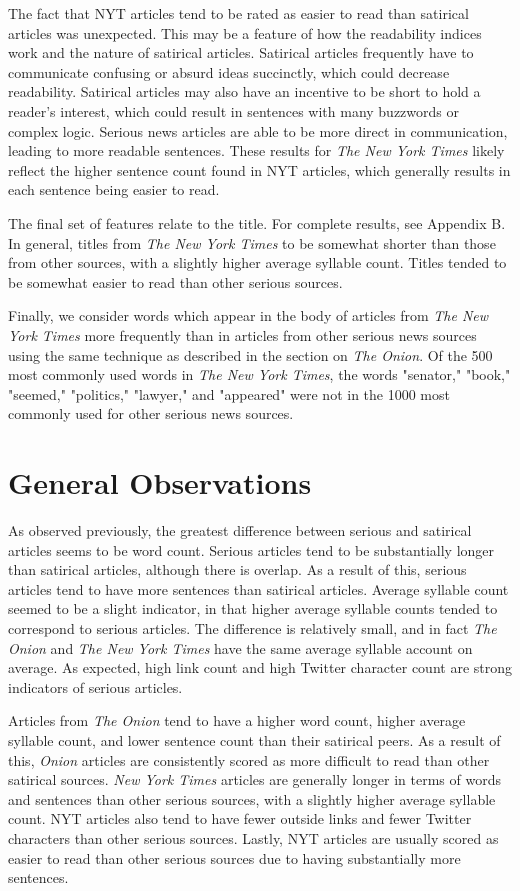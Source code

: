 \documentclass [12 pt] {report}
\begin{document}
The fact that NYT articles tend to be rated as easier to read than satirical articles was unexpected. This may be a feature of how the readability indices work and the nature of satirical articles. Satirical articles frequently have to communicate confusing or absurd ideas succinctly, which could decrease readability. Satirical articles may also have an incentive to be short to hold a reader's interest, which could result in sentences with many buzzwords or complex logic. Serious news articles are able to be more direct in communication, leading to more readable sentences. These results for \textit{The New York Times} likely reflect the higher sentence count found in NYT articles, which generally results in each sentence being easier to read.

The final set of features relate to the title. For complete results, see Appendix B. In general, titles from \textit{The New York Times} to be somewhat shorter than those from other sources, with a slightly higher average syllable count. Titles tended to be somewhat easier to read than other serious sources.

Finally, we consider words which appear in the body of articles from \textit{The New York Times} more frequently than in articles from other serious news sources using the same technique as described in the section on \textit{The Onion}. Of the 500 most commonly used words in \textit{The New York Times}, the words "senator," "book," "seemed," "politics," "lawyer," and "appeared" were not in the 1000 most commonly used for other serious news sources.

\section{General Observations}
As observed previously, the greatest difference between serious and satirical articles seems to be word count. Serious articles tend to be substantially longer than satirical articles, although there is overlap. As a result of this, serious articles tend to have more sentences than satirical articles. Average syllable count seemed to be a slight indicator, in that higher average syllable counts tended to correspond to serious articles. The difference is relatively small, and in fact \textit{The Onion} and \textit{The New York Times} have the same average syllable account on average. As expected, high link count and high Twitter character count are strong indicators of serious articles. 

Articles from \textit{The Onion} tend to have a higher word count, higher average syllable count, and lower sentence count than their satirical peers. As a result of this, \textit{Onion} articles are consistently scored as more difficult to read than other satirical sources. \textit{New York Times} articles are generally longer in terms of words and sentences than other serious sources, with a slightly higher average syllable count. NYT articles also tend to have fewer outside links and fewer Twitter characters than other serious sources. Lastly, NYT articles are usually scored as easier to read than other serious sources due to having substantially more sentences.
\end{document}
